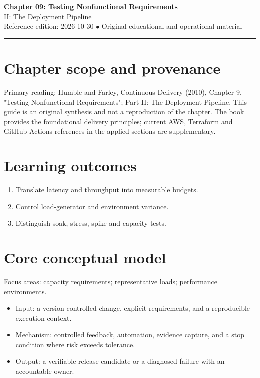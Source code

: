 \documentclass[10pt,letterpaper]{article}
\begin{document}
\begin{center}
{\LARGE\bfseries\color{cdblue}Chapter 09: Testing Nonfunctional Requirements}\\[7pt]
{\large II: The Deployment Pipeline}\\[6pt]
{\small Reference edition: 2026-10-30 $\bullet$ Original educational and operational material}
\end{center}
\noindent\color{cdblue}\rule{\linewidth}{1.2pt}\color{black}
\vspace{0.4em}
\section{Chapter scope and provenance}
Primary reading: Humble and Farley, Continuous Delivery (2010), Chapter 9, "Testing Nonfunctional Requirements"; Part II: The Deployment Pipeline. This guide is an original synthesis and not a reproduction of the chapter. The book provides the foundational delivery principles; current AWS, Terraform and GitHub Actions references in the applied sections are supplementary.


\section{Learning outcomes}
\begin{enumerate}
\item Translate latency and throughput into measurable budgets.
\item Control load-generator and environment variance.
\item Distinguish soak, stress, spike and capacity tests.
\end{enumerate}

\section{Core conceptual model}
Focus areas: capacity requirements; representative loads; performance environments.

\begin{itemize}
\item Input: a version-controlled change, explicit requirements, and a reproducible execution context.
\item Mechanism: controlled feedback, automation, evidence capture, and a stop condition where risk exceeds tolerance.
\item Output: a verifiable release candidate or a diagnosed failure with an accountable owner.
\end{itemize}
\end{document}
